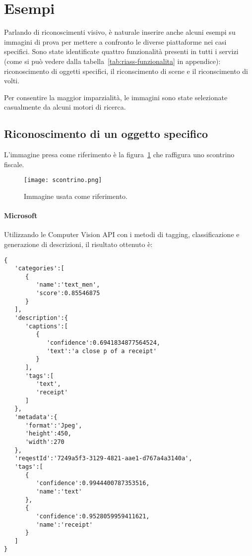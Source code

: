 
\section{Esempi}\label{sec:esempi}
Parlando di riconoscimenti visivo, è naturale inserire anche alcuni esempi su immagini di prova per mettere a confronto
le diverse piattaforme nei casi specifici.
Sono state identificate quattro funzionalità presenti in tutti i servizi (come si può vedere dalla tabella~\ref{tab:riass-funzionalita} in appendice):
riconoscimento di oggetti specifici, il riconscimento di scene e il riconscimento di volti.

Per consentire la maggior imparzialità, le immagini sono state selezionate casualmente da alcuni motori di ricerca.
%
\subsection{Riconoscimento di un oggetto specifico}\label{subsec:riconscimento-oggetto-specifico}
L'immagine presa come riferimento è la figura~\ref{fig:scontrino} che raffigura uno scontrino fiscale.
\begin{figure}[!h]
\begin{center}
	\texttt{[image: scontrino.png]}
{\scriptsize \caption{Immagine usata come riferimento.}
\label{fig:scontrino}}
\end{center}
\end{figure}
%
\paragraph{Microsoft} Utilizzando le Computer Vision API con i metodi di tagging, classificazione e generazione di descrizioni,
il risultato ottenuto è:

\label{lst:risultati-microsoft}
\begin{lstlisting}[style=myJSON]
{
   'categories':[
      {
         'name':'text_men',
         'score':0.85546875
      }
   ],
   'description':{
      'captions':[
         {
            'confidence':0.6941834877564524,
            'text':'a close p of a receipt'
         }
      ],
      'tags':[
         'text',
         'receipt'
      ]
   },
   'metadata':{
      'format':'Jpeg',
      'height':450,
      'width':270
   },
   'reqestId':'7249a5f3-3129-4821-aae1-d767a4a3140a',
   'tags':[
      {
         'confidence':0.9944400787353516,
         'name':'text'
      },
      {
         'confidence':0.9528059959411621,
         'name':'receipt'
      }
   ]
}
\end{lstlisting}
